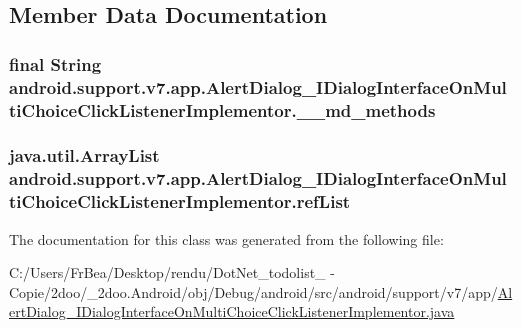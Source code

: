 \subsection{Member Data Documentation}
\hypertarget{classandroid_1_1support_1_1v7_1_1app_1_1_alert_dialog___i_dialog_interface_on_multi_choice_click_listener_implementor_0883fdfc11be8aa3d8e24db60ec91986}{
\subsubsection[{\_\-\_\-md\_\-methods}]{\setlength{\rightskip}{0pt plus 5cm}final String {\bf android.support.v7.app.AlertDialog\_\-IDialogInterfaceOnMultiChoiceClickListenerImplementor.\_\-\_\-md\_\-methods}}}
\label{classandroid_1_1support_1_1v7_1_1app_1_1_alert_dialog___i_dialog_interface_on_multi_choice_click_listener_implementor_0883fdfc11be8aa3d8e24db60ec91986}


\hypertarget{classandroid_1_1support_1_1v7_1_1app_1_1_alert_dialog___i_dialog_interface_on_multi_choice_click_listener_implementor_0d90f4d074fc47dde0a5334588fcc147}{
\subsubsection[{refList}]{\setlength{\rightskip}{0pt plus 5cm}java.util.ArrayList {\bf android.support.v7.app.AlertDialog\_\-IDialogInterfaceOnMultiChoiceClickListenerImplementor.refList}}}
\label{classandroid_1_1support_1_1v7_1_1app_1_1_alert_dialog___i_dialog_interface_on_multi_choice_click_listener_implementor_0d90f4d074fc47dde0a5334588fcc147}




The documentation for this class was generated from the following file:\begin{CompactItemize}
\item 
C:/Users/FrBea/Desktop/rendu/DotNet\_\-todolist\_ - Copie/2doo/\_\-2doo.Android/obj/Debug/android/src/android/support/v7/app/\hyperlink{_alert_dialog___i_dialog_interface_on_multi_choice_click_listener_implementor_8java}{AlertDialog\_\-IDialogInterfaceOnMultiChoiceClickListenerImplementor.java}\end{CompactItemize}
